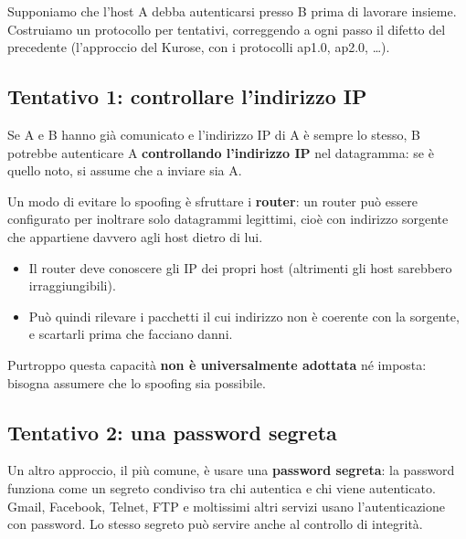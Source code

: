 Supponiamo che l'host A debba autenticarsi presso B prima di lavorare insieme. Costruiamo un protocollo per tentativi, correggendo a ogni
passo il difetto del precedente (l'approccio del Kurose, con i protocolli ap1.0, ap2.0, \dots).

\subsection{Tentativo 1: controllare l'indirizzo IP}

Se A e B hanno già comunicato e l'indirizzo IP di A è sempre lo stesso, B potrebbe autenticare A \textbf{controllando l'indirizzo IP} nel
datagramma: se è quello noto, si assume che a inviare sia A.


Un modo di evitare lo spoofing è sfruttare i \textbf{router}: un router può essere configurato per inoltrare solo datagrammi legittimi, cioè con
indirizzo sorgente che appartiene davvero agli host dietro di lui.

\begin{itemize}
    \item Il router deve conoscere gli IP dei propri host (altrimenti gli host sarebbero irraggiungibili).
    \item Può quindi rilevare i pacchetti il cui indirizzo non è coerente con la sorgente, e scartarli prima che facciano danni.
\end{itemize}

Purtroppo questa capacità \textbf{non è universalmente adottata} né imposta: bisogna assumere che lo spoofing sia possibile.

\subsection{Tentativo 2: una password segreta}

Un altro approccio, il più comune, è usare una \textbf{password segreta}: la password funziona come un segreto condiviso tra chi autentica e chi
viene autenticato. Gmail, Facebook, Telnet, FTP e moltissimi altri servizi usano l'autenticazione con password. Lo stesso segreto può servire
anche al controllo di integrità.


